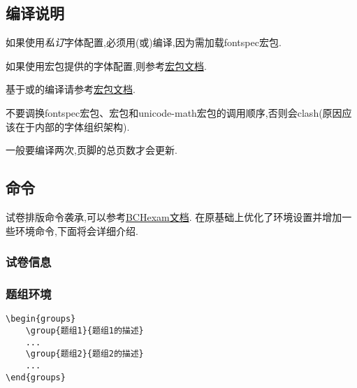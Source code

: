 \documentclass[list,answers,csize4,custom]{sysuexam}
\begin{document}
\subsection{编译说明}
\begin{compactitem}
    \item 如果使用\textit{私订}字体配置,必须用(或)编译,因为需加载fontspec宏包.
    \item 如果使用\CTeX{}宏包提供的字体配置,则参考\href{http://mirrors.ctan.org/language/chinese/ctex/ctex.pdf}{\CTeX{}宏包文档}.
    \item 基于或的编译请参考\href{http://mirrors.ctan.org/language/chinese/ctex/ctex.pdf}{\CTeX{}宏包文档}.
    \item 不要调换fontspec宏包、\CTeX{}宏包和unicode-math宏包的调用顺序,否则会clash(原因应该在于内部的字体组织架构).
    \item 一般要编译两次,页脚的总页数才会更新.
\end{compactitem}

\subsection{命令}
试卷排版命令袭承\href{https://github.com/mathedu4all/bhcexam}{},可以参考\href{http://docs.mathcrowd.cn/advances/bhcexam.html}{BCHexam文档}. 在原基础上优化了环境设置并增加一些环境命令,下面将会详细介绍.

\subsubsection{试卷信息}

\subsubsection{题组环境}
\begin{verbatim}
\begin{groups}
    \group{题组1}{题组1的描述}
    ...
    \group{题组2}{题组2的描述}
    ...
\end{groups}
\end{verbatim}
\end{document}
